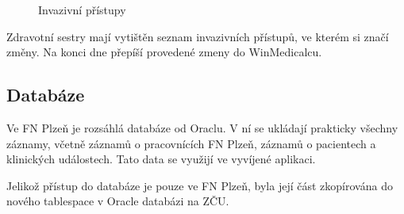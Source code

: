 \begin{figure}[h]
	\centering
	\caption{Invazivní přístupy}
  \label{fig:WM_invazivni_pristupy}
\end{figure}

Zdravotní sestry mají vytištěn seznam invazivních přístupů, ve kterém si značí změny. Na konci dne přepíší provedené zmeny do WinMedicalcu.

\subsection{Databáze}

Ve FN Plzeň je rozsáhlá databáze od Oraclu. V ní se ukládají prakticky všechny záznamy, včetně záznamů o pracovnících FN Plzeň, záznamů o pacientech a klinických událostech. Tato data se využijí ve vyvíjené aplikaci.

Jelikož přístup do databáze je pouze ve FN Plzeň, byla její část zkopírována do nového tablespace v Oracle databázi na ZČU.